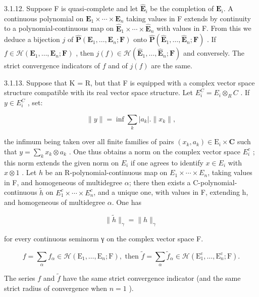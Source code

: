 3.1.12. Suppose F is quasi-complete and let \(\hat{\mathbf{E}}_{i}\) be the completion of \(\mathbf{E}_{i}\). A continuous polynomial on \(\mathbf{E}_{1} \times \cdots \times \mathbf{E}_{n}\) taking values in F extends by continuity to a polynomial-continuous map on \(\hat{\mathbf{E}}_{1} \times \cdots \times \hat{\mathbf{E}}_{n}\) with values in F. From this we deduce a bijection \(j\) of \(\hat{\mathbf{P}}(\mathbf{E}_{1}, \ldots, \mathbf{E}_{n}; \mathbf{F})\) onto \(\hat{\mathbf{P}}(\hat{\mathbf{E}}_{1}, \ldots, \hat{\mathbf{E}}_{n}; \mathbf{F})\) . If \(f \in \mathcal{H}(\mathbf{E}_{1}, \ldots, \mathbf{E}_{n}; \mathbf{F})\) , then \(j(f) \in \mathcal{H}(\hat{\mathbf{E}}_{1}, \ldots, \hat{\mathbf{E}}_{n}; \mathbf{F})\) and conversely. The strict convergence indicators of \(f\) and of \(j(f)\) are the same.

3.1.13. Suppose that K = R, but that F is equipped with a complex vector space structure compatible with its real vector space structure. Let \(E_{i}^{C} = E_{i} \otimes_{R} C\) . If \(y \in E_{i}^{C}\) , set:

\[
\| y \| = \inf \sum_ {k} | a _ {k} |. \| x _ {k} \|,
\]

the infimum being taken over all finite families of pairs \((x_{k}, a_{k}) \in \mathrm{E}_{i} \times \mathbf{C}\) such that \(y = \sum_{k} x_{k} \otimes a_{k}\) . One thus obtains a norm on the complex vector space \(E_{i}^{c}\) ; this norm extends the given norm on \(E_{i}\) if one agrees to identify \(x \in E_{i}\) with \(x \otimes 1\) . Let \(h\) be an R-polynomial-continuous map on \(E_{1} \times \cdots \times E_{n}\), taking values in F, and homogeneous of multidegree \(\alpha\); there then exists a C-polynomial-continuous \(\tilde{h}\) on \(E_{1}^{c} \times \cdots \times E_{n}^{c}\), and a unique one, with values in F, extending h, and homogeneous of multidegree \(\alpha\). One has

\[
\| \tilde {h} \| _ {\gamma} = \| h \| _ {\gamma}
\]

for every continuous seminorm γ on the complex vector space F.

\[
f = \sum_ {\alpha} f _ {\alpha} \in \mathcal {H} (\mathrm{E} _ {1}, \dots , \mathrm{E} _ {n}; \mathrm{F}), \text {   then   } \tilde {f} = \sum_ {\alpha} \tilde {f} _ {\alpha} \in \mathcal {H} (\mathrm{E} _ {1} ^ {\mathrm{c}}, \dots , \mathrm{E} _ {n} ^ {\mathrm{c}}; \mathrm{F}).
\]

The series \(f\) and \(\tilde{f}\) have the same strict convergence indicator (and the same strict radius of convergence when \(n = 1\) ).

